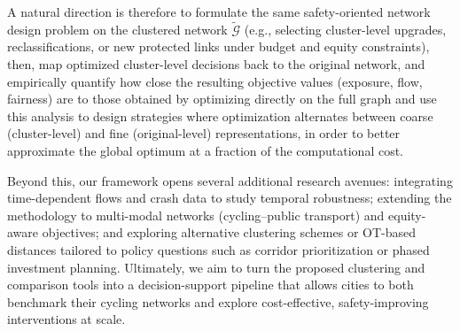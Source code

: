 \documentclass[lettersize,journal]{IEEEtran}
\begin{document}
A natural direction is therefore to formulate the same safety-oriented network design problem on the clustered network $\tilde{\mathcal{G}}$ (e.g., selecting cluster-level upgrades, reclassifications, or new protected links under budget and equity constraints), then, map optimized cluster-level decisions back to the original network, and empirically quantify how close the resulting objective values (exposure, flow, fairness) are to those obtained by optimizing directly on the full graph and use this analysis to design strategies where optimization alternates between coarse (cluster-level) and fine (original-level) representations, in order to better approximate the global optimum at a fraction of the computational cost.

Beyond this, our framework opens several additional research avenues: integrating time-dependent flows and crash data to study temporal robustness; extending the methodology to multi-modal networks (cycling--public transport) and equity-aware objectives; and exploring alternative clustering schemes or OT-based distances tailored to policy questions such as corridor prioritization or phased investment planning. Ultimately, we aim to turn the proposed clustering and comparison tools into a decision-support pipeline that allows cities to both benchmark their cycling networks and explore cost-effective, safety-improving interventions at scale.


\end{document}
